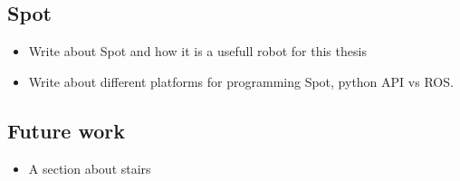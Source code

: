 \subsection{Spot}
\begin{itemize}
    \item Write about Spot and how it is a usefull robot for this thesis
    \item Write about different platforms for programming Spot, python API vs ROS.
\end{itemize}

\subsection{Future work}
\begin{itemize}
    \item A section about stairs
\end{itemize}
